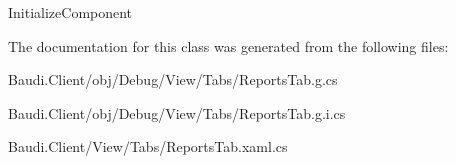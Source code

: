 Initialize\+Component 



The documentation for this class was generated from the following files\+:\begin{DoxyCompactItemize}
\item 
Baudi.\+Client/obj/\+Debug/\+View/\+Tabs/Reports\+Tab.\+g.\+cs\item 
Baudi.\+Client/obj/\+Debug/\+View/\+Tabs/Reports\+Tab.\+g.\+i.\+cs\item 
Baudi.\+Client/\+View/\+Tabs/Reports\+Tab.\+xaml.\+cs\end{DoxyCompactItemize}
